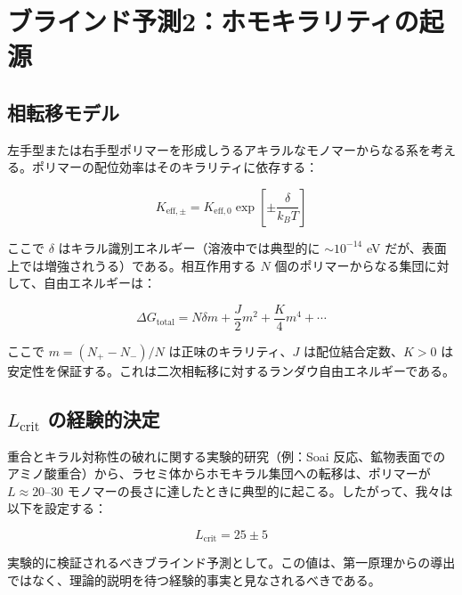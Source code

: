 \documentclass[11pt,a4paper]{article}
\begin{document}
	\section{ブラインド予測2：ホモキラリティの起源}
	\label{sec:chirality}
	
	\subsection{相転移モデル}
	
	左手型または右手型ポリマーを形成しうるアキラルなモノマーからなる系を考える。ポリマーの配位効率はそのキラリティに依存する：
	
	\begin{equation}
		K_{\mathrm{eff},\pm} = K_{\mathrm{eff},0} \exp\left[\pm \frac{\delta}{k_B T}\right]
		\label{eq:keff-chiral}
	\end{equation}
	
	ここで $\delta$ はキラル識別エネルギー（溶液中では典型的に $\sim 10^{-14}$ eV だが、表面上では増強されうる）である。相互作用する $N$ 個のポリマーからなる集団に対して、自由エネルギーは：
	
	\begin{equation}
		\Delta G_{\text{total}} = N \delta m + \frac{J}{2} m^2 + \frac{K}{4} m^4 + \cdots
		\label{eq:chiral-free}
	\end{equation}
	
	ここで $m = (N_+ - N_-)/N$ は正味のキラリティ、$J$ は配位結合定数、$K > 0$ は安定性を保証する。これは二次相転移に対するランダウ自由エネルギーである。
	
	\subsection{$L_{\text{crit}}$ の経験的決定}
	
	重合とキラル対称性の破れに関する実験的研究（例：Soai 反応、鉱物表面でのアミノ酸重合）から、ラセミ体からホモキラル集団への転移は、ポリマーが $L \approx 20$--$30$ モノマーの長さに達したときに典型的に起こる。したがって、我々は以下を設定する：
	
	\begin{equation}
		\boxed{L_{\text{crit}} = 25 \pm 5}
		\label{eq:Lcrit-empirical}
	\end{equation}
	
	実験的に検証されるべきブラインド予測として。この値は、第一原理からの導出ではなく、理論的説明を待つ経験的事実と見なされるべきである。
	
\end{document}
